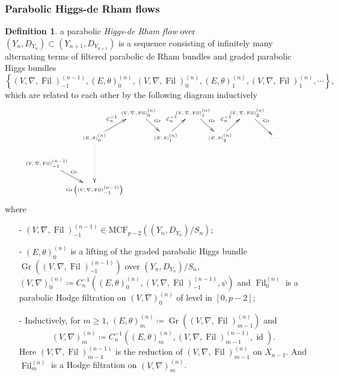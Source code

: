 \documentclass[12pt,twoside]{book}
\theoremstyle{plain}
\theoremstyle{definition}
\newtheorem{definition}[definition]{Definition}
\theoremstyle{remark}
\newcommand{\mC}{{\mathcal C}}
\DeclareMathOperator\Fil{Fil}
\DeclareMathOperator\Gr{Gr}
\DeclareMathOperator\id{id}
\newcommand{\MCF}{\mathrm{MCF}}
\numberwithin{equation}{section}
\begin{document}
\subsubsection{Parabolic Higgs-de Rham flows}
\begin{definition} a parabolic \emph{Higgs-de Rham flow} over $(Y_n,D_{Y_n})\subset (Y_{n+1},D_{Y_{n+1}})$ is a sequence consisting of infinitely many alternating terms of filtered parabolic de Rham bundles and graded parabolic Higgs bundles
\[\left\{
(V,\nabla,\Fil)^{(n-1)}_{-1},
(E,\theta)_{0}^{(n)},
(V,\nabla,\Fil)_{0}^{(n)},
(E,\theta)_{1}^{(n)},
(V,\nabla,\Fil)_{1}^{(n)},
\cdots\right\},\]
which are related to each other by the following diagram inductively
\begin{equation*}\tiny
\xymatrix@W=10mm@C=-3mm@R=5mm{
&& (V,\nabla,\Fil)_{0}^{(n)} \ar[dr]^{\Gr}
&& (V,\nabla,\Fil)_{1}^{(n)} \ar[dr]^{\Gr}
&& (V,\nabla,\Fil)_{2}^{(n)} \ar[dr]^{\Gr}
&\\
& (E,\theta)_{0}^{(n)} \ar[ur]^{\mC^{-1}_n} \ar@{..>}[dd]
&& (E,\theta)_{1}^{(n)} \ar[ur]^{\mC^{-1}_n}
&& (E,\theta)_{2}^{(n)} \ar[ur]^{\mC^{-1}_n}
&& \cdots\\
(V,\nabla,\Fil)^{(n-1)}_{-1} \ar[dr]^{\Gr}
&&&&&&&\\
&\Gr\left((V,\nabla,\Fil)^{(n-1)}_{-1}\right)
&&&&\\
}
\end{equation*}
where
\begin{itemize}
\item[-] $(V,\nabla,\Fil)^{(n-1)}_{-1}\in \MCF_{p-2}((Y_n,D_{Y_n})/S_n)$;
\item[-] $(E,\theta)_0^{(n)}$ is a lifting of the graded parabolic Higgs bundle $\Gr\left((V,\nabla,\Fil)^{(n-1)}_{-1}\right)$ over $(Y_n,D_{Y_n})/S_n$, $(V,\nabla)_0^{(n)}\coloneqq C^{-1}_n ((E,\theta)_0^{(n)},(V,\nabla,\Fil)^{(n-1)}_{-1} ,\psi)$ and $\Fil^{(n)}_0$ is a parabolic Hodge filtration on $(V,\nabla)_0^{(n)}$ of level in $[0,p-2]$;
\item[-] Inductively, for $m\geq1$, $(E,\theta)_m^{(n)}\coloneqq\Gr\left((V,\nabla,\Fil)_{m-1}^{(n)}\right)$ and
\[(V,\nabla)_m^{(n)}\coloneqq C^{-1}_n \left(
(E,\theta)_{m}^{(n)},
(V,\nabla,\Fil)^{(n-1)}_{m-1},
\id
\right).\]
Here $(V,\nabla,\Fil)^{(n-1)}_{m-1}$ is the reduction of $(V,\nabla,\Fil)^{(n)}_{m-1}$ on $X_{n-1}$. And $\Fil^{(n)}_m$ is a Hodge filtration on $(V,\nabla)_m^{(n)}$.
\end{itemize}
\end{definition}
\end{document}

